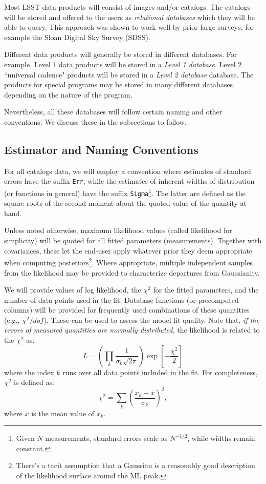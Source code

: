 \documentclass[12pt]{article}
\begin{document}
Most LSST data products will consist of images and/or catalogs. The catalogs will be stored and offered to the users as {\em relational databases} which they will be able to query. This approach was shown to work well by prior large surveys, for example the Sloan Digital Sky Survey (SDSS).

Different data products will generally be stored in different databases. For example, Level 1 data products will be stored in a {\em Level 1 database}. Level 2 ``universal cadence" products will be stored in a {\em Level 2 database} database. The products for special programs may be stored in many different databases, depending on the nature of the program.

Nevertheless, all these databases will follow certain naming and other conventions. We discuss these in the subsections to follow.



\subsection{Estimator and Naming Conventions}

For all catalogs data, we will employ a convention where estimates of standard errors have the suffix {\tt Err}, while the estimates of inherent widths of distribution (or functions in general) have the suffix {\tt Sigma}\footnote{Given $N$ measurements, standard errors scale as $N^{-1/2}$, while widths remain constant.}. The latter are defined as the square roots of the second moment about the quoted value of the quantity at hand.

Unless noted otherwise, maximum likelihood values (called likelihood for simplicity) will be quoted for all fitted parameters (measurements). Together with covariances, these let the end-user apply whatever prior they deem appropriate when computing posteriors\footnote{There's a tacit assumption that a Gaussian is a reasonably good description of the likelihood surface around the ML peak.}. Where appropriate, multiple independent samples from the likelihood may be provided to characterize departures from Gaussianity.

We will provide values of log likelihood, the $\chi^2$ for the fitted parameters, and the number of data points used in the fit. Database functions (or precomputed columns) will be provided for frequently used combinations of these quantities (e.g., $\chi^2/dof$). These can be used to assess the model fit quality. Note that, {\it if the errors of measured quantities are normally distributed,} the likelihood is related to the $\chi^2$ as:
%
\begin{equation}
    L = \left(\prod_{k}\frac{1}{\sigma_k \sqrt{2 \pi}}\right) \exp \left[- \frac{\chi^2}{2}\right]
\end{equation}
%
where the index $k$ runs over all data points included in the fit.
For completeness, $\chi^2$ is defined as:
%
\begin{equation}
      \chi^2 = \sum_{k} \left( \frac{x_k-\bar{x}}{\sigma_k}\right)^2,
\end{equation}
%
where $\bar{x}$ is the mean value of $x_k$.
\\
\end{document}
